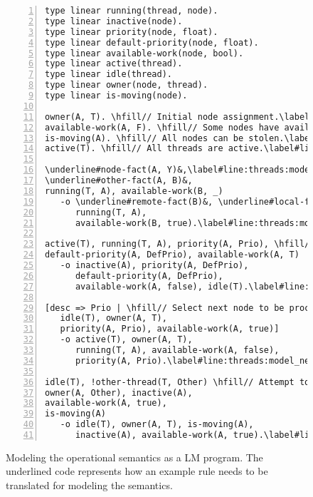\begin{figure}[h!]
\begin{Verbatim}[numbers=left,fontsize=\codesize,commandchars=\\\#\&]
type linear running(thread, node).
type linear inactive(node).
type linear priority(node, float).
type linear default-priority(node, float).
type linear available-work(node, bool).
type linear active(thread).
type linear idle(thread).
type linear owner(node, thread).
type linear is-moving(node).

owner(A, T). \hfill// Initial node assignment.\label#line:threads:model_owner&
available-work(A, F). \hfill// Some nodes have available work.\label#line:threads:model_available&
is-moving(A). \hfill// All nodes can be stolen.\label#line:threads:model_moving&
active(T). \hfill// All threads are active.\label#line:threads:model_active&

\underline#node-fact(A, Y)&,\label#line:threads:model_rule1&\hfill // Program rules go here.
\underline#other-fact(A, B)&,
running(T, A), available-work(B, _)
   -o \underline#remote-fact(B)&, \underline#local-fact(A)&,
      running(T, A),
      available-work(B, true).\label#line:threads:model_rule2&

active(T), running(T, A), priority(A, Prio), \hfill// Switching to another node.\label#line:threads:model_drop_node1&
default-priority(A, DefPrio), available-work(A, T)
   -o inactive(A), priority(A, DefPrio),
      default-priority(A, DefPrio),
      available-work(A, false), idle(T).\label#line:threads:model_drop_node2&

[desc => Prio | \hfill// Select next node to be processed.\label#line:threads:model_next_node1&
   idle(T), owner(A, T),
   priority(A, Prio), available-work(A, true)]
   -o active(T), owner(A, T),
      running(T, A), available-work(A, false),
      priority(A, Prio).\label#line:threads:model_next_node2&

idle(T), !other-thread(T, Other) \hfill// Attempt to steal a node.\label#line:threads:model_steal1&
owner(A, Other), inactive(A),
available-work(A, true),
is-moving(A)
   -o idle(T), owner(A, T), is-moving(A),
      inactive(A), available-work(A, true).\label#line:threads:model_steal2&
\end{Verbatim}
\caption{Modeling the operational semantics as a LM program. The underlined code
represents how an example rule  needs to be translated for modeling the semantics.}
\label{code:threads:modeling}
\end{figure}


